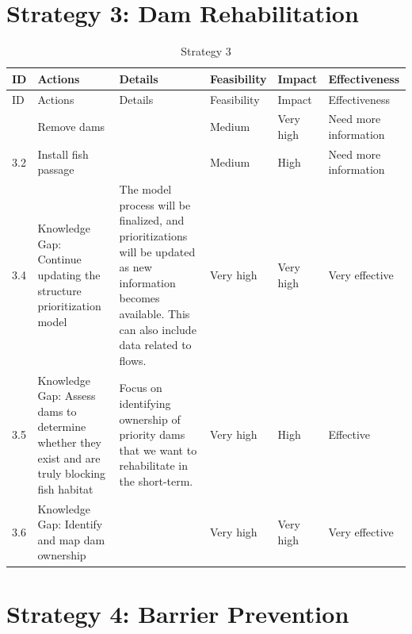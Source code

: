 \documentclass[
  letterpaper,
  DIV=11,
  numbers=noendperiod]{scrreprt}
\begin{document}
\hypertarget{strategy-3-dam-rehabilitation}{%
\section*{Strategy 3: Dam
Rehabilitation}\label{strategy-3-dam-rehabilitation}}


\hypertarget{tbl-S3}{}
\begin{longtable}[]{@{}llllll@{}}
\caption{\label{tbl-S3}Strategy 3}\label{T_7bcbb}\tabularnewline
\toprule\noalign{}
ID & Actions & Details & Feasibility & Impact & Effectiveness \\
\midrule\noalign{}
\endfirsthead
\toprule\noalign{}
ID & Actions & Details & Feasibility & Impact & Effectiveness \\
\midrule\noalign{}
\endhead
\bottomrule\noalign{}
\endlastfoot
3.1 & Remove dams & & Medium & Very high & Need more information \\
3.2 & Install fish passage & & Medium & High & Need more information \\
3.4 & Knowledge Gap: Continue updating the structure prioritization
model & The model process will be finalized, and prioritizations will be
updated as new information becomes available. This can also include data
related to flows. & Very high & Very high & Very effective \\
3.5 & Knowledge Gap: Assess dams to determine whether they exist and are
truly blocking fish habitat & Focus on identifying ownership of priority
dams that we want to rehabilitate in the short-term. & Very high & High
& Effective \\
3.6 & Knowledge Gap: Identify and map dam ownership & & Very high & Very
high & Very effective \\
\end{longtable}

\hypertarget{strategy-4-barrier-prevention}{%
\section*{Strategy 4: Barrier
Prevention}\label{strategy-4-barrier-prevention}}

\end{document}
